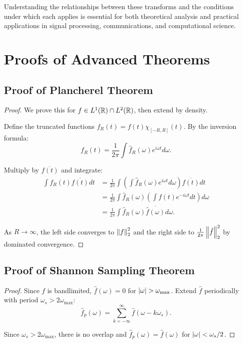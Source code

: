 \begin{notechapter}
Understanding the relationships between these transforms and the conditions under which each applies is essential for both theoretical analysis and practical applications in signal processing, communications, and computational science.

\chapterappendix

\section{Proofs of Advanced Theorems}

\subsection{Proof of Plancherel Theorem}

\begin{proof}
We prove this for $f \in L^1(\mathbb{R}) \cap L^2(\mathbb{R})$, then extend by density.

Define the truncated functions $f_R(t) = f(t) \chi_{[-R,R]}(t)$. By the inversion formula:
\[
f_R(t) = \frac{1}{2\pi} \int \hat{f}_R(\omega) e^{i\omega t} d\omega.
\]

Multiply by $\overline{f(t)}$ and integrate:
\begin{align*}
\int f_R(t) \overline{f(t)} dt &= \frac{1}{2\pi} \int \left( \int \hat{f}_R(\omega) e^{i\omega t} d\omega \right) \overline{f(t)} dt \\
&= \frac{1}{2\pi} \int \hat{f}_R(\omega) \left( \int f(t) e^{-i\omega t} dt \right) d\omega \\
&= \frac{1}{2\pi} \int \hat{f}_R(\omega) \overline{\hat{f}(\omega)} d\omega.
\end{align*}

As $R \to \infty$, the left side converges to $\left\|f\right\|_2^2$ and the right side to $\frac{1}{2\pi} \left\|\hat{f}\right\|_2^2$ by dominated convergence.
\end{proof}

\subsection{Proof of Shannon Sampling Theorem}

\begin{proof}
Since $f$ is bandlimited, $\hat{f}(\omega) = 0$ for $\left|\omega\right| > \omega_{\max}$. Extend $\hat{f}$ periodically with period $\omega_s > 2\omega_{\max}$:
\[
\hat{f}_p(\omega) = \sum_{k=-\infty}^{\infty} \hat{f}(\omega - k\omega_s).
\]

Since $\omega_s > 2\omega_{\max}$, there is no overlap and $\hat{f}_p(\omega) = \hat{f}(\omega)$ for $\left|\omega\right| < \omega_s/2$.


\end{proof}
\end{notechapter}
